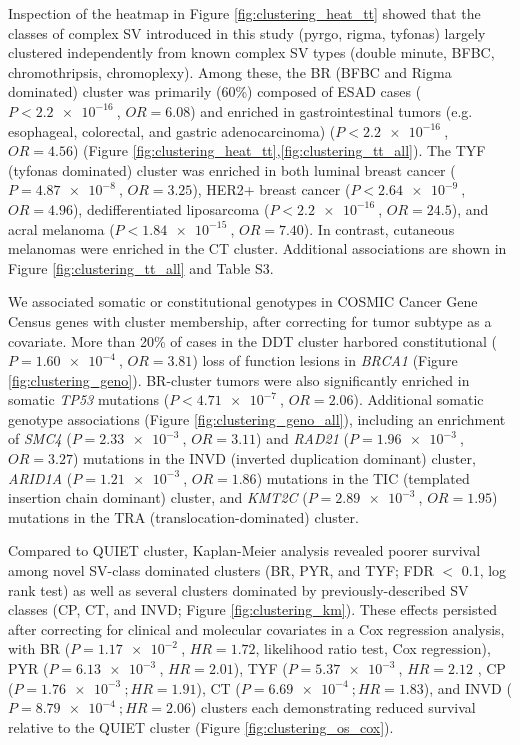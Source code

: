 \documentclass[phd,tocprelim]{cornell}
\begin{document}
Inspection of the heatmap in Figure \ref{fig:clustering_heat_tt} showed that the classes of complex SV introduced in this study (pyrgo, rigma, tyfonas) largely clustered independently from known complex SV types (double minute, BFBC, chromothripsis, chromoplexy). Among these, the BR (BFBC and Rigma dominated) cluster was primarily (60\%) composed of ESAD cases ($P < \SI{2.2e-16}{}$, $OR = 6.08$) and enriched in gastrointestinal tumors (e.g. esophageal, colorectal, and gastric adenocarcinoma) ($P < \SI{2.2e-16}{}$, $OR = 4.56$) (Figure \ref{fig:clustering_heat_tt},\ref{fig:clustering_tt_all}). The TYF (tyfonas dominated) cluster was enriched in both luminal breast cancer ($P = \SI{4.87e-8}{}$, $OR = 3.25$),  HER2+ breast cancer ($P < \SI{2.64e-9}{}$, $OR = 4.96$), dedifferentiated liposarcoma ($P < \SI{2.2e-16}{}$, $OR = 24.5$), and acral melanoma ($P < \SI{1.84e-15}{}$, $OR = 7.40$). In contrast, cutaneous melanomas were enriched in the CT cluster.  Additional associations are shown in Figure \ref{fig:clustering_tt_all} and \cite{Hadi2020-um} Table S3.

We associated somatic or constitutional genotypes in COSMIC Cancer Gene Census genes with cluster membership, after correcting for tumor subtype as a covariate. More than 20\% of cases in the DDT cluster harbored constitutional ($P = \SI{1.60e-4}{}$, $OR = 3.81$) loss of function lesions in \textit{BRCA1} (Figure \ref{fig:clustering_geno}). BR-cluster tumors were also significantly enriched in somatic \textit{TP53} mutations ($P < \SI{4.71e-7}{}$, $OR = 2.06$). Additional somatic genotype associations (Figure \ref{fig:clustering_geno_all}), including an enrichment of \textit{SMC4} ($P = \SI{2.33e-3}{}$, $OR = 3.11$) and \textit{RAD21} ($P = \SI{1.96e-3}{}$, $OR = 3.27$) mutations in the INVD (inverted duplication dominant) cluster, \textit{ARID1A} ($P = \SI{1.21e-3}{}$, $OR = 1.86$) mutations in the TIC (templated insertion chain dominant) cluster, and \textit{KMT2C} ($P = \SI{2.89e-3}{}$, $OR = 1.95$) mutations in the TRA (translocation-dominated) cluster.

Compared to QUIET cluster, Kaplan-Meier analysis revealed poorer survival among novel SV-class dominated clusters (BR, PYR, and TYF; FDR $<$ 0.1, log rank test) as well as several clusters dominated by previously-described SV classes (CP, CT, and INVD; Figure \ref{fig:clustering_km}). These effects persisted after correcting for clinical and molecular covariates in a Cox regression analysis, with BR ($P = \SI{1.17e-2}{}$, $HR = 1.72$, likelihood ratio test, Cox regression), PYR ($P = \SI{6.13e-3}{}$, $HR = 2.01$), TYF ($P = \SI{5.37e-3}{}$, $HR = 2.12$ , CP ($P = \SI{1.76e-3}{}; HR = 1.91$), CT ($P = \SI{6.69e-4}{}; HR = 1.83$), and INVD ($P = \SI{8.79e-4}{}; HR = 2.06$) clusters each demonstrating reduced survival relative to the QUIET cluster (Figure \ref{fig:clustering_os_cox}).
\end{document}
